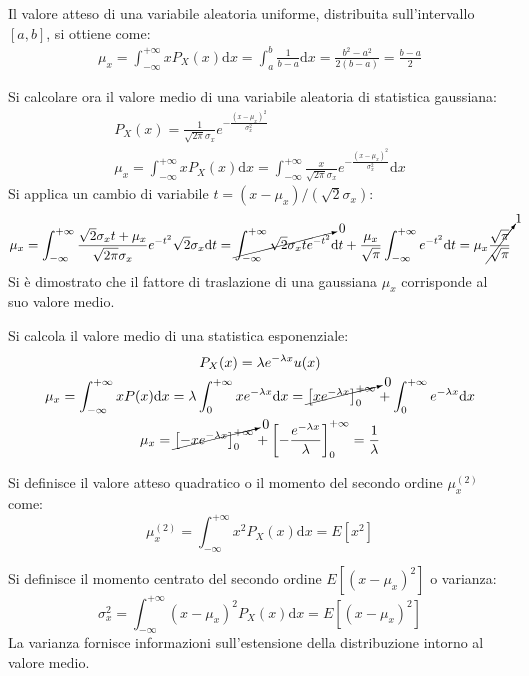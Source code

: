 \documentclass{article}
\newcommand{\df}{\mathrm{d}}
\numberwithin{equation}{subsection}
\begin{document}
Il valore atteso di una variabile aleatoria uniforme, distribuita sull'intervallo $[a,b]$, si ottiene come:
\begin{gather*}
    \mu_x=\displaystyle\int_{-\infty}^{+\infty}xP_X(x)\df x=\int_{a}^b\frac{1}{b-a}\df x=\frac{b^2-a^2}{2(b-a)}=\frac{b-a}{2}
\end{gather*}


Si calcolare ora il valore medio di una variabile aleatoria di statistica gaussiana:
\begin{gather*}
    P_X(x)=\displaystyle\frac{1}{\sqrt{2\pi}\sigma_x}e^{-\frac{(x-\mu_x)^2}{\sigma_x^2}}\\
    \mu_x=\displaystyle\int_{-\infty}^{+\infty}xP_X(x)\df x=\int_{-\infty}^{+\infty}\frac{x}{\sqrt{2\pi}\sigma_x}e^{-\frac{(x-\mu_x)^2}{\sigma_x^2}}\df x
\end{gather*}
Si applica un cambio di variabile $t=(x-\mu_x)/(\sqrt{2}\sigma_x)$:
\begin{gather*}
    \mu_x=\displaystyle\int_{-\infty}^{+\infty}\frac{\sqrt{2}\sigma_xt+\mu_x}{\sqrt{2\pi}\sigma_x}e^{-t^2}\sqrt{2}\sigma_x\df t=\cancelto{0}{\int_{-\infty}^{+\infty}\sqrt{2}\sigma_xte^{-t^2}}\df t+\frac{\mu_x}{\sqrt{\pi}}\int_{-\infty}^{+\infty}e^{-t^2}\df t=\mu_x\cancelto{1}{\frac{\sqrt{\pi}}{\sqrt{\pi}}}
\end{gather*}
Si è dimostrato che il fattore di traslazione di una gaussiana $\mu_x$ corrisponde al suo valore medio. 


Si calcola il valore medio di una statistica esponenziale:
\begin{gather*}
    P_X(x)=\lambda e^{-\lambda x}u(x)\\
    \mu_x=\displaystyle\int_{-\infty}^{+\infty}xP(x)\df x=\lambda\int_{0}^{+\infty}xe^{-\lambda x}\df x=\cancelto{0}{\left[xe^{-\lambda x}\right]_0^{+\infty}}+\int_0^{+\infty}e^{-\lambda x}\df x\\
    \mu_x=\displaystyle\cancelto{0}{\left[-xe^{-\lambda x}\right]_0^{+\infty}}+\left[-\frac{e^{-\lambda x}}{\lambda}\right]_0^{+\infty}=\frac{1}{\lambda}
\end{gather*}


Si definisce il valore atteso quadratico o il momento del secondo ordine $\mu_x^{(2)}$ come:
\begin{equation}
    \mu_x^{(2)}=\displaystyle\int_{-\infty}^{+\infty}x^2P_X(x)\df x=E[x^2]
\end{equation}

Si definisce il momento centrato del secondo ordine $E[(x-\mu_x)^2]$ o varianza:
\begin{equation}
    \sigma_x^2=\displaystyle\int_{-\infty}^{+\infty}(x-\mu_x)^2P_X(x)\df x=E[(x-\mu_x)^2]
\end{equation}
La varianza fornisce informazioni sull'estensione della distribuzione intorno al valore medio. 
\end{document}
